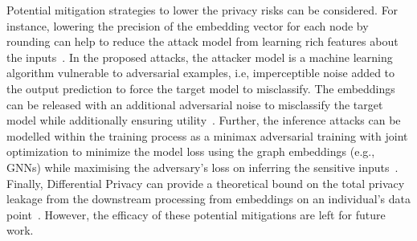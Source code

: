 Potential mitigation strategies to lower the privacy risks can be considered.
For instance, lowering the precision of the embedding vector for each node by rounding can help to reduce the attack model from learning rich features about the inputs~\cite{membershipinf,nlp}.
In the proposed attacks, the attacker model is a machine learning algorithm vulnerable to adversarial examples, i.e, imperceptible noise added to the output prediction to force the target model to misclassify.
The embeddings can be released with an additional adversarial noise to misclassify the target model while additionally ensuring utility~\cite{attriguard,memguard}.
Further, the inference attacks can be modelled within the training process as a minimax adversarial training with joint optimization to minimize the model loss using the graph embeddings (e.g., GNNs) while maximising the adversary's loss on inferring the sensitive inputs~\cite{advreg,textembleak}.
Finally, Differential Privacy can provide a theoretical bound on the total privacy leakage from the downstream processing from embeddings on an individual's data point~\cite{dptext,dpne}.
However, the efficacy of these potential mitigations are left for future work.








